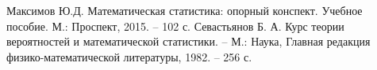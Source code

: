 \documentclass[a4paper,12pt]{article} %
\begin{document}
	
	\tableofcontents \newpage
	\listoffigures \newpage
	\listoftables \newpage
	
	
	\begin{thebibliography}{99}
		 Максимов Ю.Д. Математическая статистика: опорный конспект. Учебное пособие. М.: Проспект, 2015. -- 102 с.
		 Севастьянов Б. А. Курс теории вероятностей и математической статистики. -- М.: Наука, Главная редакция физико-математической литературы, 1982. -- 256 с.
	\end{thebibliography}
\end{document}
